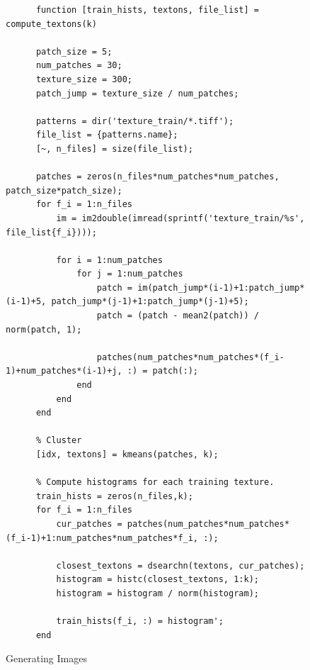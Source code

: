 \documentclass[11pt]{article}
\begin{document}
\begin{figure}[h!]
  \caption{Generating Images}
  \label{texton_train}
  \centering
    \begin{lstlisting}
      function [train_hists, textons, file_list] = compute_textons(k)

      patch_size = 5;
      num_patches = 30;
      texture_size = 300;
      patch_jump = texture_size / num_patches;

      patterns = dir('texture_train/*.tiff');
      file_list = {patterns.name};
      [~, n_files] = size(file_list);

      patches = zeros(n_files*num_patches*num_patches, patch_size*patch_size);
      for f_i = 1:n_files
          im = im2double(imread(sprintf('texture_train/%s', file_list{f_i})));

          for i = 1:num_patches
              for j = 1:num_patches
                  patch = im(patch_jump*(i-1)+1:patch_jump*(i-1)+5, patch_jump*(j-1)+1:patch_jump*(j-1)+5);
                  patch = (patch - mean2(patch)) / norm(patch, 1);

                  patches(num_patches*num_patches*(f_i-1)+num_patches*(i-1)+j, :) = patch(:);
              end
          end
      end

      % Cluster
      [idx, textons] = kmeans(patches, k);

      % Compute histograms for each training texture.
      train_hists = zeros(n_files,k);
      for f_i = 1:n_files
          cur_patches = patches(num_patches*num_patches*(f_i-1)+1:num_patches*num_patches*f_i, :);

          closest_textons = dsearchn(textons, cur_patches);
          histogram = histc(closest_textons, 1:k);
          histogram = histogram / norm(histogram);

          train_hists(f_i, :) = histogram';
      end
    \end{lstlisting}
\end{figure}
\end{document}
